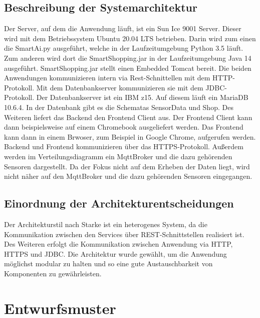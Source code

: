 \documentclass[runningheads]{llncs}
\begin{document}
\subsection{Beschreibung der Systemarchitektur}


Der Server, auf dem die Anwendung läuft, ist ein Sun Ice 9001 Server.
Dieser wird mit dem Betriebssystem Ubuntu 20.04 LTS betrieben.
Darin wird zum einen die SmartAi.py ausgeführt, welche in der Laufzeitumgebung Python 3.5 läuft.
Zum anderen wird dort die SmartShopping.jar in der Laufzeitumgebung Java 14 ausgeführt.
SmartShopping.jar stellt einen Embedded Tomcat bereit.
Die beiden Anwendungen kommunizieren intern via Rest-Schnittellen mit dem HTTP-Protokoll.
Mit dem Datenbankserver kommunizieren sie mit dem JDBC-Protokoll.
Der Datenbankserver ist ein IBM z15.
Auf diesem läuft ein MariaDB 10.6.4.
In der Datenbank gibt es die Schematas SensorData und Shop.
Des Weiteren liefert das Backend den Frontend Client aus.
Der Frontend Client kann dann beispielsweise auf einem Chromebook ausgeliefert werden.
Das Frontend kann dann in einem Brwoser, zum Beispiel in Google Chrome, aufgerufen werden.
Backend und Frontend kommunizieren über das HTTPS-Protokoll.
Außerdem werden im Verteilungsdiagramm ein MqttBroker und die dazu gehörenden Sensoren dargestellt.
Da der Fokus nicht auf dem Erheben der Daten liegt, wird nicht näher auf den MqttBroker und die dazu gehörenden Sensoren eingegangen.

\subsection{Einordnung der Architekturentscheidungen}
Der Architekturstil nach Starke ist ein heterogenes System, da die Kommunikation zwischen den Services über REST-Schnittstellen realisiert ist.
Des Weiteren erfolgt die Kommunikation zwischen Anwendung via HTTP, HTTPS und JDBC.
Die Architektur wurde gewählt, um die Anwendung möglichst modular zu halten und so eine gute Austauschbarkeit von Komponenten zu gewährleisten.

\newpage
\section{Entwurfsmuster}
\end{document}
